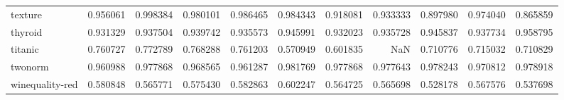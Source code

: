 \begin{tabular}{lrrrrrrrrrr}
texture         &   0.956061 &  0.998384 &  0.980101 &  0.986465 &  0.984343 &  0.918081 &  0.933333 &  0.897980 &  0.974040 &  0.865859 \\
thyroid         &   0.931329 &  0.937504 &  0.939742 &  0.935573 &  0.945991 &  0.932023 &  0.935728 &  0.945837 &  0.937734 &  0.958795 \\
titanic         &   0.760727 &  0.772789 &  0.768288 &  0.761203 &  0.570949 &  0.601835 &       NaN &  0.710776 &  0.715032 &  0.710829 \\
twonorm         &   0.960988 &  0.977868 &  0.968565 &  0.961287 &  0.981769 &  0.977868 &  0.977643 &  0.978243 &  0.970812 &  0.978918 \\
winequality-red &   0.580848 &  0.565771 &  0.575430 &  0.582863 &  0.602247 &  0.564725 &  0.565698 &  0.528178 &  0.567576 &  0.537698 \\
\bottomrule
\end{tabular}
